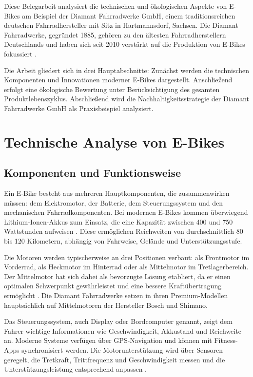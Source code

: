 \documentclass[12pt,a4paper]{article}
\begin{document}
Diese Belegarbeit analysiert die technischen und ökologischen Aspekte von E-Bikes am Beispiel der Diamant Fahrradwerke GmbH, einem traditionsreichen deutschen Fahrradhersteller mit Sitz in Hartmannsdorf, Sachsen. Die Diamant Fahrradwerke, gegründet 1885, gehören zu den ältesten Fahrradherstellern Deutschlands und haben sich seit 2010 verstärkt auf die Produktion von E-Bikes fokussiert \cite{diamant2024}.

Die Arbeit gliedert sich in drei Hauptabschnitte: Zunächst werden die technischen Komponenten und Innovationen moderner E-Bikes dargestellt. Anschließend erfolgt eine ökologische Bewertung unter Berücksichtigung des gesamten Produktlebenszyklus. Abschließend wird die Nachhaltigkeitsstrategie der Diamant Fahrradwerke GmbH als Praxisbeispiel analysiert.

\clearpage
\section{Technische Analyse von E-Bikes}

\subsection{Komponenten und Funktionsweise}

Ein E-Bike besteht aus mehreren Hauptkomponenten, die zusammenwirken müssen: dem Elektromotor, der Batterie, dem Steuerungssystem und den mechanischen Fahrradkomponenten. Bei modernen E-Bikes kommen überwiegend Lithium-Ionen-Akkus zum Einsatz, die eine Kapazität zwischen 400 und 750 Wattstunden aufweisen \cite{bosch2023}. Diese ermöglichen Reichweiten von durchschnittlich 80 bis 120 Kilometern, abhängig von Fahrweise, Gelände und Unterstützungsstufe.

Die Motoren werden typischerweise an drei Positionen verbaut: als Frontmotor im Vorderrad, als Heckmotor im Hinterrad oder als Mittelmotor im Tretlagerbereich. Der Mittelmotor hat sich dabei als bevorzugte Lösung etabliert, da er einen optimalen Schwerpunkt gewährleistet und eine bessere Kraftübertragung ermöglicht \cite{kalkhoff2023}. Die Diamant Fahrradwerke setzen in ihren Premium-Modellen hauptsächlich auf Mittelmotoren der Hersteller Bosch und Shimano.

Das Steuerungssystem, auch Display oder Bordcomputer genannt, zeigt dem Fahrer wichtige Informationen wie Geschwindigkeit, Akkustand und Reichweite an. Moderne Systeme verfügen über GPS-Navigation und können mit Fitness-Apps synchronisiert werden. Die Motorunterstützung wird über Sensoren geregelt, die Tretkraft, Trittfrequenz und Geschwindigkeit messen und die Unterstützungsleistung entsprechend anpassen \cite{bosch2023}.
\end{document}
